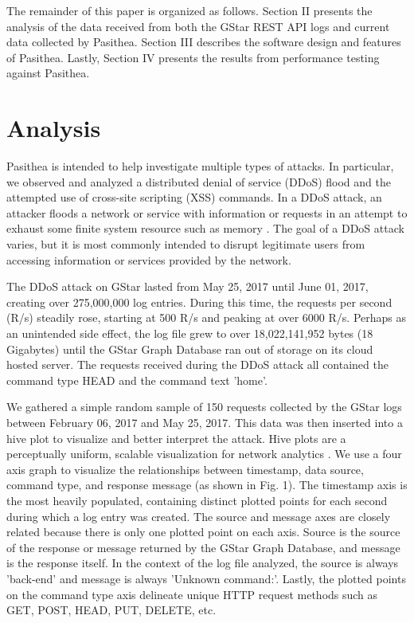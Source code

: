 The remainder of this paper is organized as follows. Section II presents the analysis of the data received from both the GStar REST API logs and current data collected by Pasithea. Section III describes the software design and features of Pasithea. Lastly, Section IV presents the results from performance testing against Pasithea.


\section{Analysis}
\label{Analysis}
Pasithea is intended to help investigate multiple types of attacks.  In particular, we observed and analyzed a distributed denial of service (DDoS) flood and the attempted use of cross-site scripting (XSS) commands. In a DDoS attack, an attacker floods a network or service with information or requests in an attempt to exhaust some finite system resource such as memory \cite{DoS-Def}. The goal of a DDoS attack varies, but it is most commonly intended to disrupt legitimate users from accessing information or services provided by the network.

The DDoS attack on GStar lasted from May 25, 2017 until June 01, 2017, creating over 275,000,000 log entries. During this time, the requests per second (R/s) steadily rose, starting at 500 R/s and peaking at over 6000 R/s. Perhaps as an unintended side effect, the log file grew to over 18,022,141,952 bytes (18 Gigabytes) until the GStar Graph Database ran out of storage on its cloud hosted server. The requests received during the DDoS attack all contained the command type HEAD and the command text 'home'.

We gathered a simple random sample of 150 requests collected by the GStar logs between February 06, 2017 and May 25, 2017.  This data was then inserted into a hive plot to visualize and better interpret the attack. Hive plots are a perceptually uniform, scalable visualization for network analytics \cite{Hive-Plot}.  We use a four axis graph to visualize the relationships between timestamp, data source, command type, and response message (as shown in Fig. 1). The timestamp axis is the most heavily populated, containing distinct plotted points for each second during which a log entry was created. The source and message axes are closely related because there is only one plotted point on each axis. Source is the source of the response or message returned by the GStar Graph Database, and message is the response itself. In the context of the log file analyzed, the source is always 'back-end' and message is always 'Unknown command:'. Lastly, the plotted points on the command type axis delineate unique HTTP request methods such as GET, POST, HEAD, PUT, DELETE, etc.

